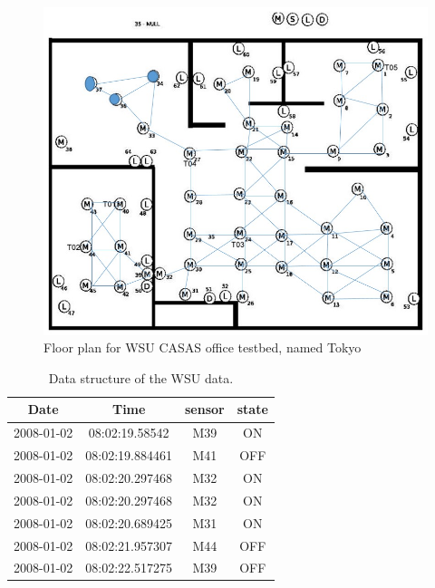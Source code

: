 \begin{figure}[!ht]
\includegraphics[scale=0.5]{./pics/LabSensorsLayout.jpg}
\centering
\caption{Floor plan for WSU CASAS office testbed, named Tokyo}
\label{fig:casas}
\end{figure}

\begin{table}[]
\centering
\caption{Data structure of the WSU data.}
\label{tab:WSUDATA}
\begin{tabular}{|c|c|c|c|}
\hline
Date       & Time            & sensor & state \\ \hline
2008-01-02 & 08:02:19.58542  & M39    & ON    \\ \hline
2008-01-02 & 08:02:19.884461 & M41    & OFF   \\ \hline
2008-01-02 & 08:02:20.297468 & M32    & ON    \\ \hline
2008-01-02 & 08:02:20.297468 & M32    & ON    \\ \hline
2008-01-02 & 08:02:20.689425 & M31    & ON    \\ \hline
2008-01-02 & 08:02:21.957307 & M44    & OFF   \\ \hline
2008-01-02 & 08:02:22.517275 & M39    & OFF   \\ \hline
\end{tabular}
\end{table}




